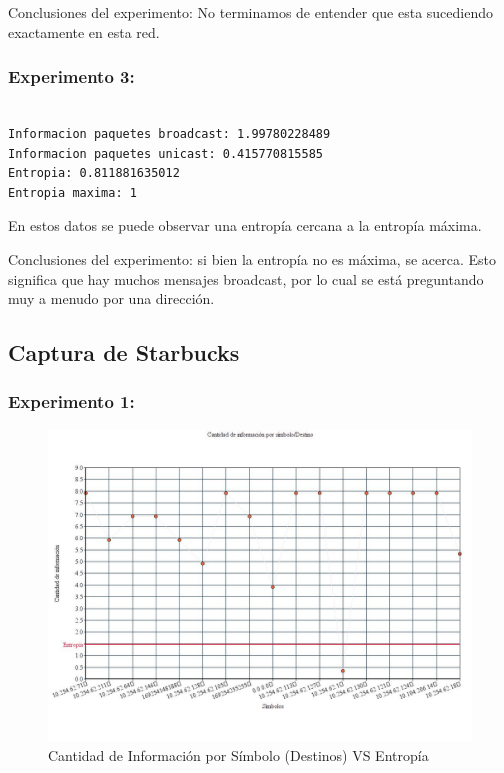 Conclusiones del experimento: No terminamos de entender que esta sucediendo exactamente en esta red. 

\subsubsection{Experimento 3:}
\begin{verbatim}

Informacion paquetes broadcast: 1.99780228489
Informacion paquetes unicast: 0.415770815585
Entropia: 0.811881635012
Entropia maxima: 1

\end{verbatim}

En estos datos se puede observar una entropía cercana a la entropía máxima.

Conclusiones del experimento: si bien la entropía no es máxima, se acerca. Esto significa que hay muchos mensajes broadcast, por lo cual se está preguntando muy a menudo por una dirección.

\newpage
\subsection{Captura de Starbucks}

\subsubsection{Experimento 1:}


\begin{figure}[H]
  \centering
    \includegraphics[scale=0.45]{imagenes/graficos/entropiaCantInf/04destino.jpg}
  \caption{Cantidad de Información por Símbolo (Destinos) VS Entropía}
  \label{fig:10}
\end{figure}

